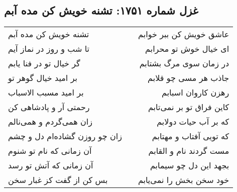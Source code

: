 \begin{center}
\section*{غزل شماره ۱۷۵۱: تشنه خویش کن مده آبم}
\label{sec:1751}
\begin{longtable}{l p{0.5cm} r}
تشنه خویش کن مده آبم
&&
عاشق خویش کن ببر خوابم
\\
تا شب و روز در نماز آیم
&&
ای خیال خوش تو محرابم
\\
گر خیال تو در فنا یابم
&&
در زمان سوی مرگ بشتابم
\\
بر امید خیال گوهر تو
&&
جاذب هر مسی چو قلابم
\\
بر امید مسبب الاسباب
&&
رهزن کاروان اسبابم
\\
رحمتی آر و پادشاهی کن
&&
کاین فراق تو بر نمی‌تابم
\\
زان همی‌گردم و همی‌نالم
&&
که بر آب حیات دولابم
\\
زان چو روزن گشاده‌ام دل و چشم
&&
که تویی آفتاب و مهتابم
\\
آن زمانی که نام تو شنوم
&&
مست گردند نام و القابم
\\
آن زمانی که آتش تو رسد
&&
بجهد این دل چو سیمابم
\\
بس کن از گفت کز غبار سخن
&&
خود سخن بخش را نمی‌یابم
\\
\end{longtable}
\end{center}
